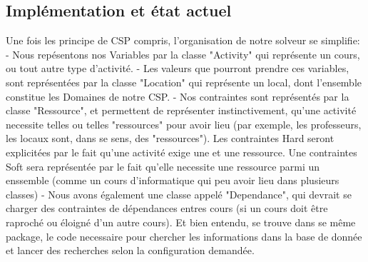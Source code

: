 \subsection{Implémentation et état actuel}
Une fois les principe de CSP compris, l'organisation de notre solveur se simplifie: 
- Nous repésentons nos Variables par la classe "Activity" qui représente un cours, ou tout autre type d'activité.\newline
- Les valeurs que pourront prendre ces variables, sont représentées par la classe "Location" qui représente un local, dont l'ensemble constitue les Domaines de notre CSP.\newline
- Nos contraintes sont représentés par la classe "Ressource", et permettent de représenter instinctivement, qu'une activité necessite telles ou telles "ressources" pour avoir lieu (par exemple, les professeurs, les locaux sont, dans se sens, des "ressources"). Les contraintes Hard seront explicitées par le fait qu'une activité exige une et une ressource. Une contraintes Soft sera représentée par le fait qu'elle necessite une ressource parmi un enssemble (comme un cours d'informatique qui peu avoir lieu dans plusieurs classes) \newline
- Nous avons également une classe appelé "Dependance", qui devrait se charger des contraintes de dépendances entres cours (si un cours doit être raproché ou éloigné d'un autre cours). \newline
Et bien entendu, se trouve dans se même package, le code necessaire pour chercher les informations dans la base de donnée et lancer des recherches selon la configuration demandée.

\indent

